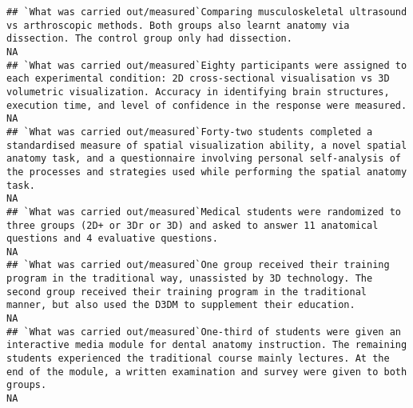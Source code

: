 \documentclass[]{article}
\begin{document}
\begin{verbatim}
## `What was carried out/measured`Comparing musculoskeletal ultrasound vs arthroscopic methods. Both groups also learnt anatomy via dissection. The control group only had dissection.                                                                                                                                                                                                                                                                                                     NA
## `What was carried out/measured`Eighty participants were assigned to each experimental condition: 2D cross-sectional visualisation vs 3D volumetric visualization. Accuracy in identifying brain structures, execution time, and level of confidence in the response were measured.                                                                                                                                                                                                      NA
## `What was carried out/measured`Forty-two students completed a standardised measure of spatial visualization ability, a novel spatial anatomy task, and a questionnaire involving personal self-analysis of the processes and strategies used while performing the spatial anatomy task.                                                                                                                                                                                                 NA
## `What was carried out/measured`Medical students were randomized to three groups (2D+ or 3Dr or 3D) and asked to answer 11 anatomical questions and 4 evaluative questions.                                                                                                                                                                                                                                                                                                              NA
## `What was carried out/measured`One group received their training program in the traditional way, unassisted by 3D technology. The second group received their training program in the traditional manner, but also used the D3DM to supplement their education.                                                                                                                                                                                                                         NA
## `What was carried out/measured`One-third of students were given an interactive media module for dental anatomy instruction. The remaining students experienced the traditional course mainly lectures. At the end of the module, a written examination and survey were given to both groups.                                                                                                                                                                                            NA

\end{verbatim}
\end{document}
